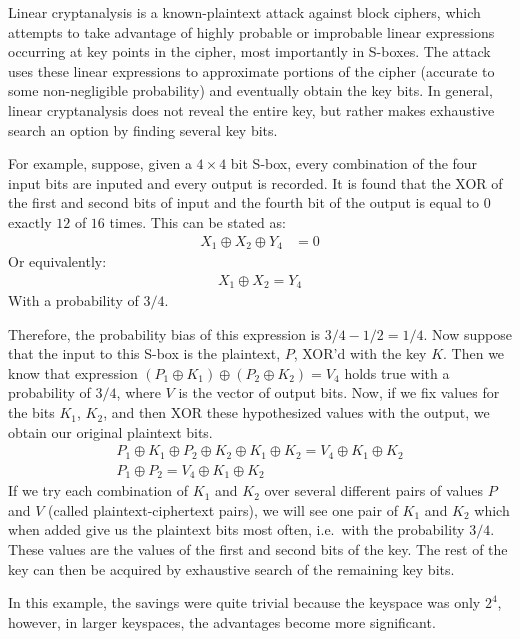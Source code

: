\documentclass[12pt, a4paper, final]{report}
\begin{document}
Linear cryptanalysis is a known-plaintext attack against block ciphers,
which attempts to take advantage of highly probable or improbable linear
expressions occurring at key points in the cipher, most importantly in
S-boxes. The attack uses these linear expressions to approximate portions
of the cipher (accurate to some non-negligible probability) and eventually
obtain the key bits. In general, linear cryptanalysis does not reveal the
entire key, but rather makes exhaustive search an option by finding several
key bits.

For example, suppose, given a $4 \times 4$ bit S-box, every combination
of the four input bits are inputed and every output is recorded.
It is found that the XOR of the first and second bits of input and the
fourth bit of the output is equal to $0$ exactly $12$ of $16$ times.
This can be stated as:
\begin{align*}
    X_1 \oplus X_2 \oplus Y_4 & = 0
\end{align*}
Or equivalently:
\begin{align*}
    X_1 \oplus X_2 = Y_4
\end{align*}
With a probability of $3/4$.

Therefore, the probability bias of this expression is $3/4 - 1/2 = 1/4$.
Now suppose that the input to this S-box is the plaintext, $P$, XOR'd with
the key $K$. Then we know that expression $(P_1 \oplus K_1) \oplus (P_2
\oplus K_2) = V_4$ holds true with a probability of $3/4$, where $V$ is the
vector of output bits. Now, if we fix values for the bits $K_1$, $K_2$, and
then XOR these hypothesized values with the output, we obtain our original
plaintext bits.
\begin{align*}
    P_1 \oplus K_1 \oplus P_2 \oplus K_2 \oplus K_1 \oplus K_2 = V_4
    \oplus K_1 \oplus K_2\\
    P_1 \oplus P_2 = V_4 \oplus K_1 \oplus K_2
\end{align*}
If we try each combination of $K_1$ and $K_2$ over several different
pairs of values $P$ and $V$ (called plaintext-ciphertext pairs), we will
see one pair of $K_1$ and $K_2$ which when added give us the plaintext bits
most often, i.e.\ with the probability $3/4$. These values are the values of
the first and second bits of the key. The rest of the key can then be acquired
by exhaustive search of the remaining key bits.

In this example, the savings were quite trivial because the keyspace was only
$2^4$, however, in larger keyspaces, the advantages become more significant.
\end{document}
